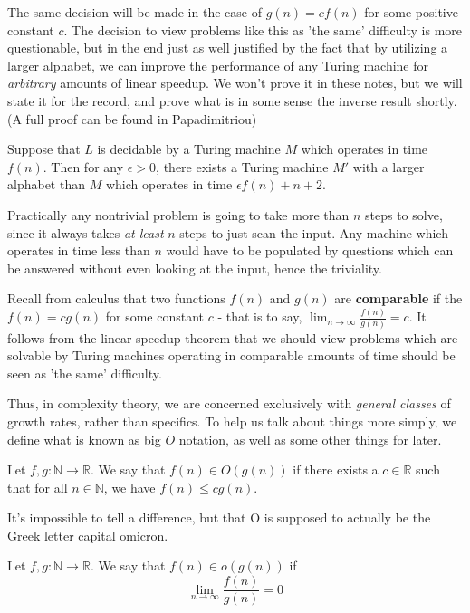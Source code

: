 The same decision will be made in the case of $g(n) = cf(n)$ for some positive constant $c$. The decision to view problems like this as 'the same' difficulty is more questionable, but in the end just as well justified by the fact that by utilizing a larger alphabet, we can improve the performance of any Turing machine for \textit{arbitrary} amounts of linear speedup. We won't prove it in these notes, but we will state it for the record, and prove what is in some sense the inverse result shortly. (A full proof can be found in Papadimitriou)

\begin{theorem}
	Suppose that $L$ is decidable by a Turing machine $M$ which operates in time $f(n)$. Then for any $\epsilon > 0$, there exists a Turing machine $M'$ with a larger alphabet than $M$ which operates in time $\epsilon f(n)+n+2$.
\end{theorem}
Practically any nontrivial problem is going to take more than $n$ steps to solve, since it always takes \textit{at least} $n$ steps to just scan the input. Any machine which operates in time less than $n$ would have to be populated by questions which can be answered without even looking at the input, hence the triviality.

Recall from calculus that two functions $f(n)$ and $g(n)$ are \textbf{comparable} if  the $f(n) = cg(n)$ for some constant $c$ - that is to say, $\lim_{n \to \infty} \frac{f(n)}{g(n)} = c$. It follows from the linear speedup theorem that we should view problems which are solvable by Turing machines operating in comparable amounts of time should be seen as 'the same' difficulty.

Thus, in complexity theory, we are concerned exclusively with \textit{general classes} of growth rates, rather than specifics. To help us talk about things more simply, we define what is known as big $O$ notation, as well as some other things for later.
\begin{definition}[Big O]
Let $f,g:\mathbb{N} \to \mathbb{R}$. We say that \textbf{$f(n) \in O(g(n))$} if there exists a $c \in \mathbb{R}$ such that for all $n \in \mathbb{N}$, we have $f(n) \leq cg(n)$. 
\end{definition}
It's impossible to tell a difference, but that O is supposed to actually be the Greek letter capital omicron.
\begin{definition}[Little o]
	Let $f,g:\mathbb{N} \to \mathbb{R}$. We say that $f(n) \in o(g(n))$ if 
	\[\lim_{n \to \infty}\frac{f(n)}{g(n)} = 0 \]
\end{definition}

